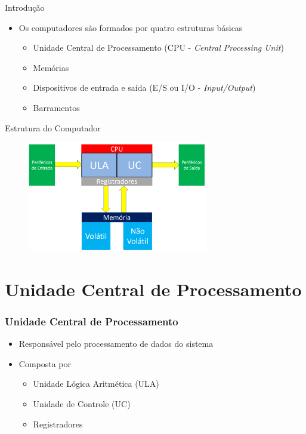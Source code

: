 \documentclass[aspectratio=169,
				xcolor=table]{beamer}
\begin{document}
		\begin{frame}{Introdução}
			\begin{itemize}
				\item Os computadores são formados por quatro estruturas básicas
				\begin{itemize}
					\item Unidade Central de Processamento (CPU - \textit{Central Processing Unit})
					\item Memórias
					\item Dispositivos de entrada e saída (E/S ou I/O - \textit{Input/Output})
					\item Barramentos
				\end{itemize}
			\end{itemize}
		\end{frame}
		
		\begin{frame}{Estrutura do Computador}
			\begin{figure}
			\centering
				\includegraphics[width=0.7\textwidth, keepaspectratio]{../figs/cap04/estrutura.png} 
			\end{figure}
		\end{frame}
			
	\section{Unidade Central de Processamento}
	
		\begin{frame}
			\frametitle{Unidade Central de Processamento}
			\begin{itemize}
				\item Responsável pelo processamento de dados do sistema

				\item Composta por
				\begin{itemize}
					\item Unidade Lógica Aritmética (ULA)
					\item  Unidade de Controle (UC)
					\item  Registradores
				\end{itemize}
			\end{itemize}
		\end{frame}
		
\end{document}
